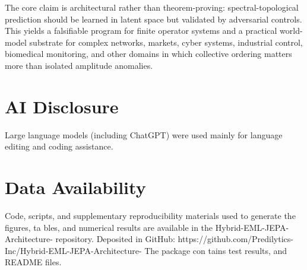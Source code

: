 \documentclass[11pt]{article}
\begin{document}
The core claim is architectural rather than theorem-proving: spectral-topological prediction should be learned in latent space but validated by adversarial controls. This yields a falsifiable program for finite operator systems and a practical world-model substrate for complex networks, markets, cyber systems, industrial control, biomedical monitoring, and other domains in which collective ordering matters more than isolated amplitude anomalies.

\section{AI Disclosure}
Large language models (including ChatGPT) were used mainly for language editing and coding assistance.

\section{Data Availability}
Code, scripts, and supplementary reproducibility materials used to generate the figures, ta
bles, and numerical results are available in the Hybrid-EML-JEPA-Architecture- repository.
Deposited in GitHub: https://github.com/Predilytics-Inc/Hybrid-EML-JEPA-Architecture- The package con
tains test results, and README files.
\end{document}
